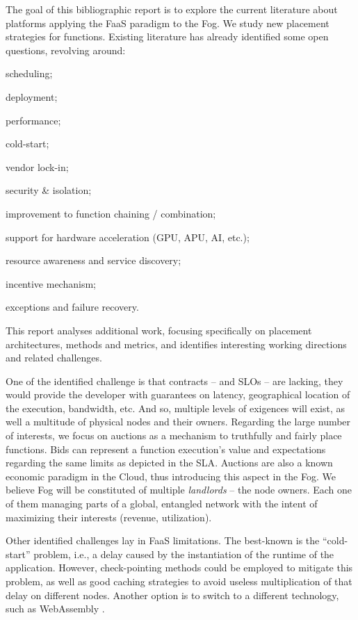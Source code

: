 \documentclass[11pt]{sdm}
\begin{document}
The goal of this bibliographic report is to explore the current literature about platforms applying the \gls{FaaS} paradigm to the Fog. We study new placement strategies for functions. Existing literature \cite{kjorveziroski_iot_2021,xie_when_2021} has already identified some open questions, revolving around:
\begin{enumerate*}[(1)]
	\item scheduling;
	\item deployment;
	\item performance;
	\item cold-start;
	\item vendor lock-in;
	\item security \& isolation;
	\item improvement to function chaining / combination;
	\item support for hardware acceleration (\gls{GPU}, \gls{APU}, \gls{AI}, etc.);
	\item resource awareness and service discovery;
	\item incentive mechanism;
	\item exceptions and failure recovery.
\end{enumerate*}
This report analyses additional work, focusing specifically on placement architectures, methods and metrics, and identifies interesting working directions and related challenges.

One of the identified challenge is that contracts --  and \glspl{SLO} -- are lacking, they would provide the developer with guarantees on latency, geographical location of the execution, bandwidth, etc. And so, multiple levels of exigences will exist, as well a multitude of physical nodes and their owners. Regarding the large number of interests, we focus on auctions as a mechanism to truthfully and fairly place functions. Bids can represent a function execution's value and expectations regarding the same limits as depicted in the \gls{SLA}. Auctions are also a known economic paradigm in the Cloud, thus introducing this aspect in the Fog. We believe Fog will be constituted of multiple \emph{landlords} -- the node owners. Each one of them managing parts of a global, entangled network with the intent of maximizing their interests (revenue, utilization).

Other identified challenges lay in \gls{FaaS} limitations. The best-known is the ``cold-start'' problem, i.e., a delay caused by the instantiation of the runtime of the application. However, check-pointing methods could be employed to mitigate this problem, as well as good caching strategies to avoid useless multiplication of that delay on different nodes. Another option is to switch to a different technology, such as WebAssembly \cite{hykes_solomon_2019}.
\end{document}

